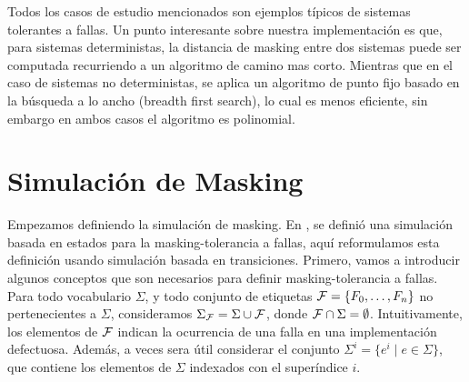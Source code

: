 Todos los casos de estudio mencionados son ejemplos típicos de sistemas tolerantes a fallas. Un punto interesante sobre nuestra implementación es que, para sistemas deterministas, la distancia de masking entre dos sistemas puede ser computada recurriendo a un algoritmo de camino mas corto. Mientras que en el caso de sistemas no deterministas, se aplica un algoritmo de punto fijo basado en la búsqueda a lo ancho (breadth first search), lo cual es menos eficiente, sin embargo en ambos casos el algoritmo es polinomial.


%

\section{Simulación de Masking} \label{sec:masking_dist}
Empezamos definiendo la simulación de masking. En \cite{DemasiCMA17}, se definió una simulación basada en estados para la masking-tolerancia a fallas, aquí reformulamos esta definición usando simulación basada en transiciones. Primero, vamos a introducir algunos conceptos que son necesarios para definir masking-tolerancia a fallas. Para todo vocabulario $\Sigma$, y todo conjunto de etiquetas $\mathcal{F} = \{F_0, \dots, F_n\}$ no pertenecientes a $\Sigma$, consideramos 
$\Sigma_{\mathcal{F}} = \Sigma \cup \mathcal{F}$, donde $\mathcal{F} \cap \Sigma = \emptyset$. Intuitivamente, los elementos de $\mathcal{F}$ indican la ocurrencia de una falla en una implementación defectuosa. Además, a veces sera útil considerar el conjunto $\Sigma^i = \{ e^i \mid e \in \Sigma\}$, que contiene los elementos de $\Sigma$ indexados con el superíndice $i$.


